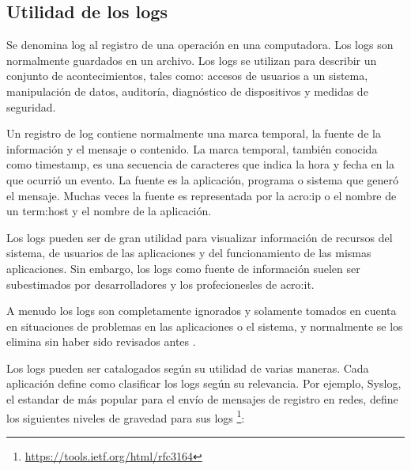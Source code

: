 \subsection{Utilidad de los logs}
\label{utilidad_de_los_logs}
Se denomina log al registro de una operación en una computadora. Los logs son
normalmente guardados en un archivo. Los logs se utilizan para describir un
conjunto de acontecimientos, tales como: accesos de usuarios a un sistema,
manipulación de datos, auditoría, diagnóstico de dispositivos y medidas de
seguridad.

Un registro de log contiene normalmente una marca temporal, la fuente de la
información y el mensaje o contenido. La marca temporal, también conocida como
timestamp, es una secuencia de caracteres que indica la hora y fecha en la que
ocurrió un evento. La fuente es la aplicación, programa o sistema que generó el
mensaje. Muchas veces la fuente es representada por la \gls{acro:ip} o el
nombre de un \gls{term:host} y el nombre de la aplicación.

Los logs pueden ser de gran utilidad para visualizar información de recursos
del sistema, de usuarios de las aplicaciones y del funcionamiento de las mismas
aplicaciones. Sin embargo, los logs como fuente de información suelen ser
subestimados por desarrolladores y los profecionesles de \gls{acro:it}.

A menudo los logs son completamente ignorados y solamente tomados en cuenta en
situaciones de problemas en las aplicaciones o el sistema, y normalmente se los
elimina sin haber sido revisados antes
\cite[p.~16]{monitoreo:logging_and_log_management}.

Los logs pueden ser catalogados según su utilidad de varias maneras. Cada
aplicación define como clasificar los logs según su relevancia. Por ejemplo,
Syslog, el estandar de más popular para el envío de mensajes de registro en
redes, define los siguientes niveles de gravedad para sus logs
\footnote{\url{https://tools.ietf.org/html/rfc3164}}:


